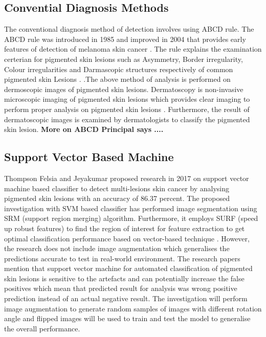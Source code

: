 \subsection{Convential Diagnosis Methods}

The conventional diagnosis method of detection involves
using ABCD rule. The ABCD rule was introduced in 1985 and improved in 2004 that 
provides early features of detection of melanoma skin cancer \citep*{DanielJensen2015}. 
The rule explains the examination certerian for pigmented skin lesions such as  Asymmetry, 
Border irregularity, Colour irregularities and  Darmascopic structures respectively of common pigmented skin
Lesions \citep*{LOESCHER2013170}. 
.The above method of analysis is performed on 
dermoscopic images of pigmented skin lesions.  Dermatoscopy is 
non-invasive microscopic imaging of pigmented skin lesions which provides clear imaging to perform 
proper analysis on pigmented skin lesions \citep*{LOESCHER2013170}. 
Furthermore, the result of dermatoscopic images is examined 
by dermatologists to classify the pigmented skin lesion.  \textbf{More on ABCD Principal says ....}

\subsection{Support Vector Based Machine}
Thompson Felsia and Jeyakumar proposed research in 2017 on 
support vector machine based classifier to detect multi-lesions skin cancer by analysing pigmented skin lesions with an accuracy of 86.37 percent.
The proposed investigation with SVM based classifier has performed image segmentation using SRM (support region merging) algorithm. Furthermore, it employs SURF (speed up robust features) to find the region 
of interest for feature extraction to get optimal classification performance based on vector-based technique \citep*{thompson2017vector}. 
However, the research does not include image augmentation which generalises the predictions accurate to test in 
real-world environment. The research papers mention that support vector machine for automated classification of pigmented skin lesions is sensitive to the artefacts and can 
potentially increase the false positives which mean that predicted result for analysis was wrong positive prediction instead of an actual negative result. The investigation will perform image augmentation to generate random 
samples of images with different rotation angle and flipped images will be used to train and test the model to generalise the overall performance.


